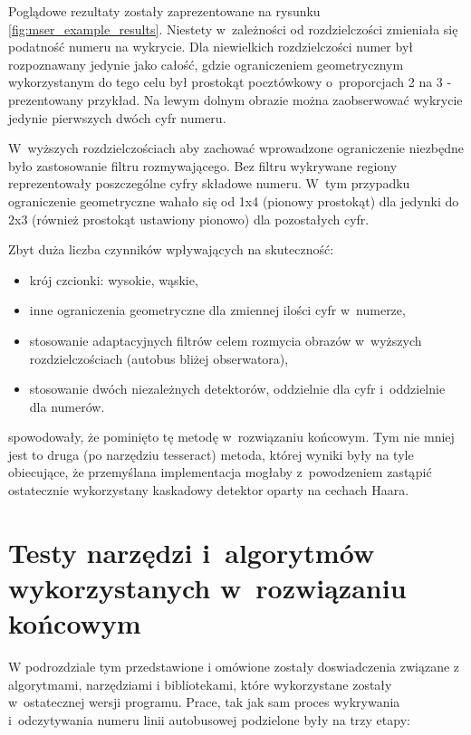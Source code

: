 Poglądowe rezultaty zostały zaprezentowane na rysunku
\ref{fig:mser_example_results}.
Niestety w~zależności od rozdzielczości zmieniała się podatność
numeru na wykrycie. Dla niewielkich rozdzielczości numer był rozpoznawany
jedynie jako całość, gdzie ograniczeniem geometrycznym wykorzystanym
do tego celu był prostokąt pocztówkowy o~proporcjach 2 na 3 - prezentowany
przykład. Na lewym dolnym obrazie można zaobserwować wykrycie jedynie
pierwszych dwóch cyfr numeru.

W~wyższych rozdzielczościach aby zachować wprowadzone ograniczenie
niezbędne było zastosowanie filtru rozmywającego. Bez filtru
wykrywane regiony reprezentowały poszczególne cyfry składowe numeru.
W~tym przypadku ograniczenie geometryczne wahało się od 1x4 (pionowy
prostokąt) dla jedynki do 2x3 (również prostokąt ustawiony pionowo) dla
pozostałych cyfr.

Zbyt duża liczba czynników wpływających na skuteczność:

\begin{itemize}
    \item krój czcionki: wysokie, wąskie,
    \item inne ograniczenia geometryczne dla zmiennej ilości cyfr
        w~numerze,
    \item stosowanie adaptacyjnych filtrów celem rozmycia obrazów
        w~wyższych rozdzielczościach (autobus bliżej obserwatora),
    \item stosowanie dwóch niezależnych detektorów, oddzielnie dla
        cyfr i~oddzielnie dla numerów.
\end{itemize}

spowodowały, że pominięto tę metodę w~rozwiązaniu końcowym.
Tym nie mniej jest to druga (po narzędziu tesseract) metoda, której
wyniki były na tyle obiecujące, że przemyślana implementacja
mogłaby z~powodzeniem zastąpić ostatecznie wykorzystany kaskadowy
detektor oparty na cechach Haara.


\section{Testy narzędzi i~algorytmów wykorzystanych w~rozwiązaniu 
	końcowym}

W podrozdziale tym przedstawione i omówione zostały doswiadczenia związane
z algorytmami, narzędziami i bibliotekami, które wykorzystane zostały
w~ostatecznej wersji programu. Prace, tak jak sam proces wykrywania 
i~odczytywania numeru linii autobusowej podzielone były na trzy etapy:

